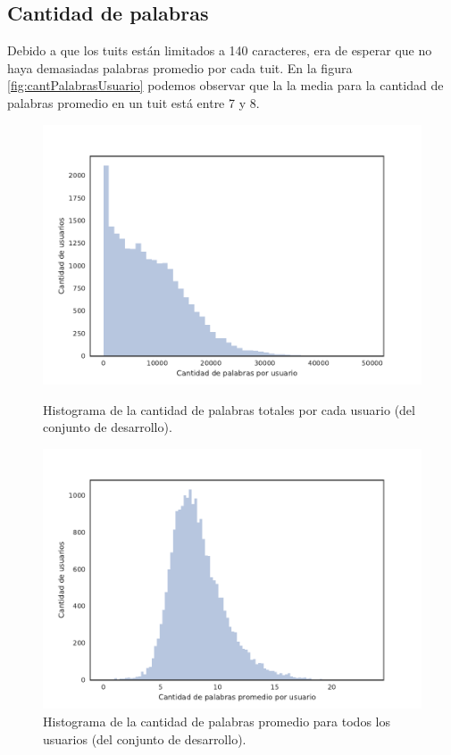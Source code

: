 \subsection{Cantidad de palabras}
Debido a que los tuits están limitados a 140 caracteres, era de esperar que no haya demasiadas palabras promedio por cada tuit. En la figura \ref{fig:cantPalabrasUsuario} podemos observar que la la media para la cantidad de palabras promedio en un tuit está entre 7 y 8.
\begin{figure}[!ht]\centering
  \begin{minipage}{0.49\textwidth}
    \includegraphics[width=\linewidth]{./images/train/conFiltro/cantPalabrasUsuario.pdf}
    \caption{Histograma de la cantidad de palabras totales por cada usuario (del conjunto de desarrollo).} 
    \label{fig:cantPalabrasUsuario} 
   \end{minipage}
   \begin{minipage}{0.49\textwidth}
    \includegraphics[width=\linewidth]{./images/train/conFiltro/cantPalabrasPromedio.pdf}
    \caption{Histograma de la cantidad de palabras promedio para todos los usuarios (del conjunto de desarrollo).} 
    \label{fig:cantPalabrasPromedio} 
   \end{minipage}
   
\end{figure}

